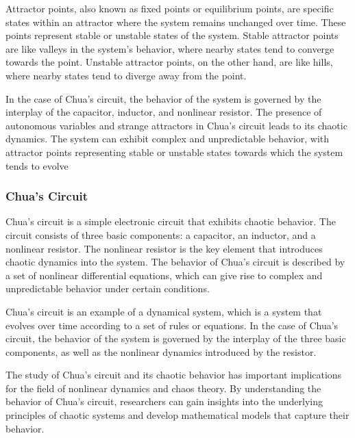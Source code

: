 \documentclass[12pt]{article}
\begin{document}
                Attractor points, also known as fixed points or equilibrium points, are specific states within an attractor where 
                the system remains unchanged over time. These points represent stable or unstable states of the system. Stable 
                attractor points are like valleys in the system's behavior, where nearby states tend to converge towards the 
                point. Unstable attractor points, on the other hand, are like hills, where nearby states tend to diverge away 
                from the point.

                In the case of Chua's circuit, the behavior of the system is governed by the interplay of the capacitor, 
                inductor, and nonlinear resistor. The presence of autonomous variables and strange attractors in Chua's circuit 
                leads to its chaotic dynamics. The system can exhibit complex and unpredictable behavior, with attractor points 
                representing stable or unstable states towards which the system tends to evolve


                \subsubsection{Chua's Circuit}

                Chua's circuit is a simple electronic circuit that exhibits chaotic behavior. The circuit consists of
                three basic components: a capacitor, an inductor, and a nonlinear resistor. The nonlinear resistor 
                is the key element that introduces chaotic dynamics into the system. The behavior of Chua's circuit 
                is described by a set of nonlinear differential equations, which can give rise to complex and unpredictable 
                behavior under certain conditions.

                Chua's circuit is an example of a dynamical system, which is a system that evolves over time according to
                a set of rules or equations. In the case of Chua's circuit, the behavior of the system is governed by the
                interplay of the three basic components, as well as the nonlinear dynamics introduced by the resistor.

                The study of Chua's circuit and its chaotic behavior has important implications for the field of nonlinear
                dynamics and chaos theory. By understanding the behavior of Chua's circuit, researchers can gain insights
                into the underlying principles of chaotic systems and develop mathematical models that capture their behavior.
\end{document}
